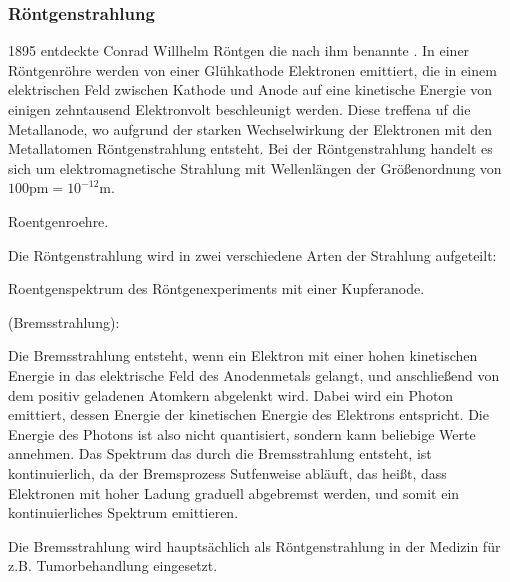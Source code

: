 \documentclass{tuftebook}
\begin{document}
        \subsubsection{Röntgenstrahlung}
        
        1895 entdeckte Conrad Willhelm Röntgen die nach ihm benannte . In einer Röntgenröhre werden von einer Glühkathode Elektronen emittiert, die in einem elektrischen Feld zwischen Kathode und Anode auf eine kinetische Energie von einigen zehntausend Elektronvolt beschleunigt werden. Diese treffena uf die Metallanode, wo aufgrund der starken Wechselwirkung der Elektronen mit den Metallatomen Röntgenstrahlung entsteht. Bei der Röntgenstrahlung handelt es sich um elektromagnetische Strahlung mit Wellenlängen der Größenordnung von $100\mathrm{pm}=10^{-12}\mathrm{m}$.
        \begin{marginfigure}
            \centering
            \caption{Roentgenroehre.}
            \label{fig:roentgenroehre}
        \end{marginfigure}
        Die Röntgenstrahlung wird in zwei verschiedene Arten der Strahlung aufgeteilt:
        \begin{marginfigure}
            \centering
            \caption{Roentgenspektrum des Röntgenexperiments mit einer Kupferanode.}
            \label{fig:roentgenspektrum}
        \end{marginfigure}
        \begin{typ}
            \vspace{-1em}
            (Bremsstrahlung):
            \vspace{\baselineskip}

            \noindent Die Bremsstrahlung entsteht, wenn ein Elektron mit einer hohen kinetischen Energie in das elektrische Feld des Anodenmetals gelangt, und anschließend von dem positiv geladenen Atomkern abgelenkt wird. Dabei wird ein Photon emittiert, dessen Energie der kinetischen Energie des Elektrons entspricht. Die Energie des Photons ist also nicht quantisiert, sondern kann beliebige Werte annehmen.
            Das Spektrum das durch die Bremsstrahlung entsteht, ist kontinuierlich, da der Bremsprozess Sutfenweise abläuft, das heißt, dass Elektronen mit hoher Ladung graduell abgebremst werden, und somit ein kontinuierliches Spektrum emittieren.
        \end{typ}
        Die Bremsstrahlung wird hauptsächlich als Röntgenstrahlung in der Medizin für z.B. Tumorbehandlung eingesetzt.
\end{document}
